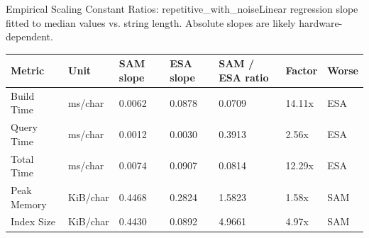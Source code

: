 \begin{benchmarktable}{Empirical Scaling Constant Ratios: repetitive\_with\_noise}{Linear regression slope fitted to median values vs. string length. Absolute slopes are likely hardware-dependent.}
\begin{tabularx}{\textwidth}{|X|X|X|X|X|X|X|}
\toprule
Metric & Unit & SAM slope & ESA slope & SAM / ESA ratio & Factor & Worse \\
\midrule
Build Time & ms/char & 0.0062 & 0.0878 & 0.0709 & 14.11x & ESA \\
Query Time & ms/char & 0.0012 & 0.0030 & 0.3913 & 2.56x & ESA \\
Total Time & ms/char & 0.0074 & 0.0907 & 0.0814 & 12.29x & ESA \\
Peak Memory & KiB/char & 0.4468 & 0.2824 & 1.5823 & 1.58x & SAM \\
Index Size & KiB/char & 0.4430 & 0.0892 & 4.9661 & 4.97x & SAM \\
\bottomrule
\end{tabularx}
\end{benchmarktable}